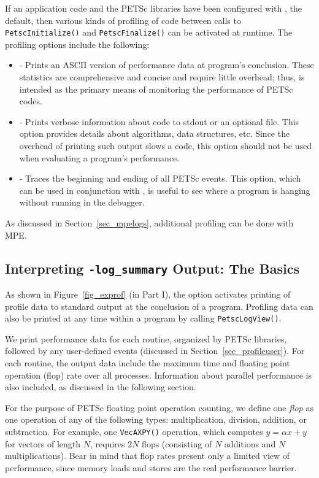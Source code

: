 If an application code and the PETSc libraries have been configured with
, the default,
then various kinds of profiling of code between calls to \lstinline{PetscInitialize()} and \lstinline{PetscFinalize()} can be
activated at runtime.  The profiling options include the following:
 
\begin{itemize}
\item {} - Prints an ASCII version of performance data
     at program's conclusion. These statistics are comprehensive and concise
     and require little overhead; thus,  is intended as
     the primary means of monitoring the performance of PETSc codes.
\item {} - Prints verbose information about code to
     stdout or an optional file. This option provides details about algorithms,
     data structures, etc. Since the overhead of printing such output slows a
     code, this option should not be used when evaluating a program's performance.
\item {} - Traces the beginning and ending of all
     PETSc events.  This option, which can be used in conjunction with
     , is useful to see where a program is hanging
     without running in the debugger.
\end{itemize}
 As discussed in Section~\ref{sec_mpelogs},
additional profiling can be done with MPE.

\subsection{Interpreting {\tt -log\_summary} Output: The Basics}
\label{sec_ploginfo}

As shown in Figure~\ref{fig_exprof} (in Part I), the option
  activates printing of profile
data to standard output at the conclusion of a program.  Profiling
data can also be printed at any time within a program by calling \lstinline{PetscLogView()}.

We print performance data for each routine, organized by PETSc
libraries, followed by any user-defined events (discussed in
Section~\ref{sec_profileuser}).  For each routine, the output data
include the maximum time and floating point operation (flop) rate over
all processes.  Information about parallel performance is also
included, as discussed in the following section.

For the purpose of PETSc floating point operation counting, we define
one {\em flop} as one operation of any of the following types:
multiplication, division, addition, or subtraction.  For example, one
\lstinline{VecAXPY()} operation, which computes $y = \alpha x + y$ for
vectors of length $N$, requires $2N$ flops (consisting of $N$
additions and $N$ multiplications).  Bear in mind that flop rates
present only a limited view of performance, since memory loads and stores are
the real performance barrier.

